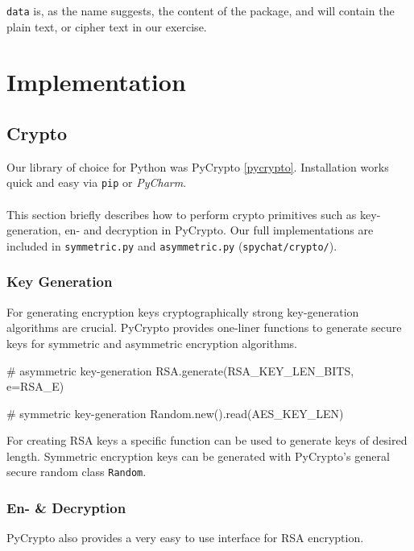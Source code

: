 \documentclass[11pt, a4paper]{article}
\begin{document}
\lstinline|data| is, as the name suggests, the content of the package,
and will contain the plain text, or cipher text in our exercise. 

\section{Implementation}

\subsection{Crypto}

Our library of choice for Python was PyCrypto \ref{pycrypto}. Installation works quick and easy via \lstinline|pip| or \textit{PyCharm}.
\\\\
This section briefly describes how to perform crypto primitives such as key-generation, en- and decryption in PyCrypto.
Our full implementations are included in \lstinline|symmetric.py| and \lstinline|asymmetric.py| (\lstinline|spychat/crypto/|).

\subsubsection{Key Generation}

For generating encryption keys cryptographically strong key-generation algorithms are crucial. PyCrypto provides one-liner functions to generate secure keys for symmetric and asymmetric encryption algorithms.

\vspace{5pt}
\begin{python}
# asymmetric key-generation
RSA.generate(RSA_KEY_LEN_BITS, e=RSA_E)

# symmetric key-generation
Random.new().read(AES_KEY_LEN)
\end{python}
\vspace{10pt}

For creating RSA keys a specific function can be used to generate keys of desired length. Symmetric encryption keys can be generated with PyCrypto's general secure random class \lstinline|Random|.

\subsubsection{En- \& Decryption}

PyCrypto also provides a very easy to use interface for RSA encryption.
\end{document}
